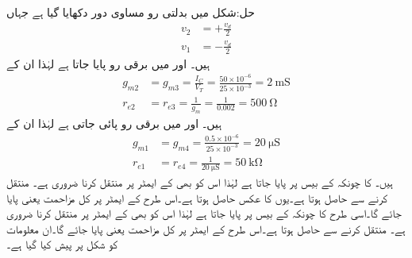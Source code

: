 حل:شکل  میں بدلتی رو مساوی دور دکھایا گیا ہے جہاں
\begin{align*}
v_2&=+\frac{v_d}{2}\\
v_1&=-\frac{v_d}{2}
\end{align*}
ہیں۔ اور   میں  برقی رو پایا جاتا ہے لہٰذا ان کے
\begin{align*}
g_{m2}&=g_{m3}=\frac{I_C}{V_T}=\frac{50 \times 10^{-6}}{25 \times 10^{-3}}=\SI{2}{\milli \siemens}\\
r_{e2}&=r_{e3} = \frac{1}{g_m}=\frac{1}{0.002}=\SI{500}{\ohm}
\end{align*}
ہیں۔ اور  میں  برقی رو پائی جاتی ہے لہٰذا ان کے
\begin{align*}
g_{m1}&=g_{m4}=\frac{0.5 \times 10^{-6}}{25 \times 10^{-3}}=\SI{20}{\micro \siemens}\\
r_{e1}&=r_{e4}=\frac{1}{\SI{20}{\micro \siemens}}=\SI{50}{\kilo \ohm}
\end{align*}
ہیں۔ کا  چونکہ  کے بیس پر پایا جاتا ہے لہٰذا اس کو بھی   کے ایمٹر پر منتقل کرنا ضروری ہے۔ منتقل کرنے سے  حاصل ہوتا ہے۔یوں  کا عکس  حاصل ہوتا ہے۔اس طرح   کے ایمٹر پر کل مزاحمت  یعنی   پایا جائے گا۔اسی طرح  کا  چونکہ  کے بیس پر پایا جاتا ہے لہٰذا اس کو بھی   کے ایمٹر پر منتقل کرنا ضروری ہے۔ منتقل کرنے سے  حاصل ہوتا ہے۔اس طرح   کے ایمٹر پر کل مزاحمت  یعنی   پایا جائے گا۔ان معلومات کو شکل  پر پیش کیا گیا ہے۔

